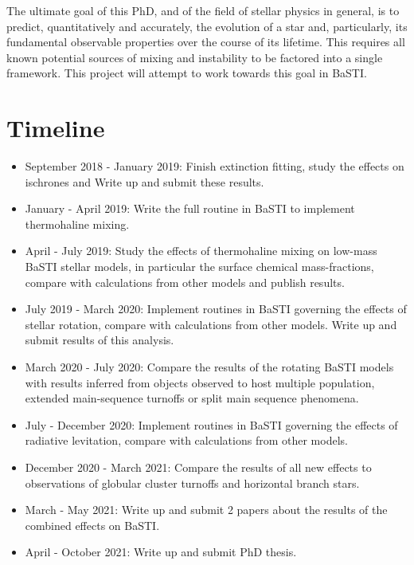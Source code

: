\documentclass[12pt, a4paper]{report}
\begin{document}
The ultimate goal of this PhD, and of the field of stellar physics in general, is to predict, quantitatively and accurately, the evolution of a star and, particularly, its fundamental observable properties over the course of its lifetime. This requires all known potential sources of mixing and instability to be factored into a single framework. This project will attempt to work towards this goal in BaSTI.

\section{Timeline}
\begin{itemize}
\item September 2018 - January 2019: Finish extinction fitting, study the effects on ischrones and Write up and submit these results.
\item January - April 2019: Write the full routine in BaSTI to implement thermohaline mixing.
\item April - July 2019: Study the effects of thermohaline mixing on low-mass BaSTI stellar models, in particular the surface chemical mass-fractions, compare with calculations from other models and publish results.
\item July 2019 - March 2020: Implement routines in BaSTI governing the effects of stellar rotation, compare with calculations from other models. Write up and submit results of this analysis.
\item March 2020 - July 2020: Compare the results of the rotating BaSTI models with results inferred from objects observed to host multiple population, extended main-sequence turnoffs or split main sequence phenomena.
\item July - December 2020: Implement routines in BaSTI governing the effects of radiative levitation, compare with calculations from other models.
\item December 2020 - March 2021: Compare the results of all new effects to observations of globular cluster turnoffs and horizontal branch stars.
\item March - May 2021: Write up and submit 2 papers about the results of the combined effects on BaSTI.
\item April - October 2021: Write up and submit PhD thesis.
\end{itemize}


\end{document}

